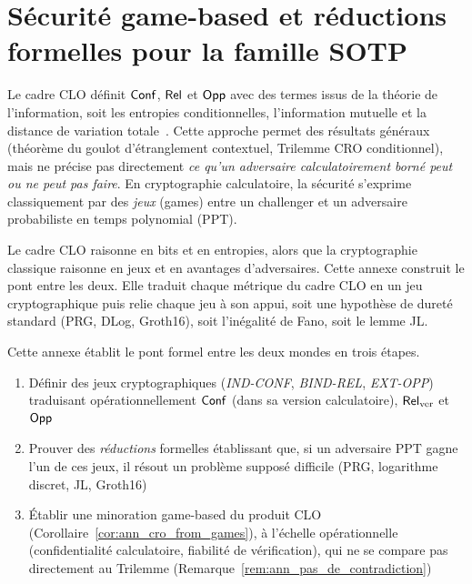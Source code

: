 
\chapter{S\'ecurit\'e game-based et r\'eductions formelles pour la famille SOTP}
\label{chap:annexe_gamebased}

\begin{sloppypar}
Le cadre CLO d\'efinit $\mathsf{Conf}$, $\mathsf{Rel}$ et $\mathsf{Opp}$ avec des termes issus de la théorie de l'information, soit les entropies conditionnelles, l'information
mutuelle et la distance de variation totale~\cite{MINKA2026CLO}. Cette approche
permet des r\'esultats g\'en\'eraux (th\'eor\`eme du goulot d'\'etranglement
contextuel, Trilemme CRO conditionnel), mais ne pr\'ecise pas directement
\emph{ce qu'un adversaire calculatoirement born\'e peut ou ne peut pas
faire}. En cryptographie calculatoire, la s\'ecurit\'e s'exprime
classiquement par des \emph{jeux} (games) entre un challenger et un
adversaire probabiliste en temps polynomial (PPT).

Le cadre CLO raisonne en bits et en entropies, alors que la cryptographie classique
raisonne en jeux et en avantages d'adversaires. Cette annexe construit
le pont entre les deux. Elle traduit chaque m\'etrique du cadre CLO
en un jeu cryptographique puis relie chaque jeu \`a son appui, soit une hypoth\`ese
de duret\'e standard (PRG, DLog, Groth16), soit l'in\'egalit\'e de Fano, soit le lemme JL.

Cette annexe \'etablit le pont formel entre les deux mondes en trois \'etapes.
\begin{enumerate}
\item D\'efinir des jeux cryptographiques (\emph{IND-CONF},
      \emph{BIND-REL}, \emph{EXT-OPP}) traduisant op\'erationnellement
      $\mathsf{Conf}$ (dans sa version calculatoire), $\mathsf{Rel}_{\mathrm{ver}}$ et $\mathsf{Opp}$
\item Prouver des \emph{r\'eductions} formelles \'etablissant que, si un adversaire PPT
      gagne l'un de ces jeux, il r\'esout un probl\`eme suppos\'e difficile
      (PRG, logarithme discret, JL, Groth16)
\item \'Etablir une minoration game-based du produit CLO
      (Corollaire~\ref{cor:ann_cro_from_games}), \`a l'\'echelle op\'erationnelle
      (confidentialit\'e calculatoire, fiabilit\'e de v\'erification), qui ne se
      compare pas directement au Trilemme
      (Remarque~\ref{rem:ann_pas_de_contradiction})
\end{enumerate}


\end{sloppypar}
